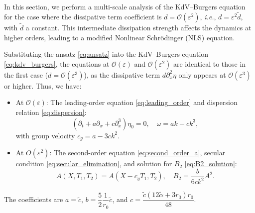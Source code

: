 \documentclass[alpha-refs, 12pt]{wiley-article}
\renewcommand{\O}{\mathcal{O}}
\newcommand{\eps}{\varepsilon}
\begin{document}
In this section, we perform a multi-scale analysis of the KdV--Burgers equation for the case where the dissipative term coefficient is $d = \O(\eps^2)$, \emph{i.e.}, $d = \eps^2 \tilde{d}$, with $\tilde{d}$ a constant. This intermediate dissipation strength affects the dynamics at higher orders, leading to a modified Nonlinear Schr\"odinger (NLS) equation. 

Substituting the ansatz \eqref{eq:ansatz} into the KdV--Burgers equation \eqref{eq:kdv_burgers}, the equations at $\O(\eps)$ and $\O(\eps^2)$ are identical to those in the first case ($d = \O(\eps^3)$), as the dissipative term $d \partial_x^2 \eta$ only appears at $\O(\eps^3)$ or higher. Thus, we have:
\begin{itemize}
    \item At $\O(\eps)$: The leading-order equation \eqref{eq:leading_order} and dispersion relation \eqref{eq:dispersion}:
    \[
    \left( \partial_t + a \partial_x + c \partial_x^3 \right) \eta_0 = 0, \quad \omega = a k - c k^3,
    \]
    with group velocity $c_g = a - 3 c k^2$.
    \item At $O(\eps^2)$: The second-order equation \eqref{eq:second_order_a}, secular condition \eqref{eq:secular_elimination}, and solution for $B_2$ \eqref{eq:B2_solution}:
    \[
    A(X, T_1, T_2) = A(X - c_g T_1, T_2), \quad B_2 = \frac{b}{6 c k^2} A^2.
    \]
\end{itemize}
The coefficients are $a = \tilde{c}$, $b = \dfrac{5}{2} \dfrac{1}{r_0} \tilde{c}$, and $c = \dfrac{\tilde{c} (12 \tilde{\alpha} + 3 r_0) r_0}{48}$.
\end{document}
